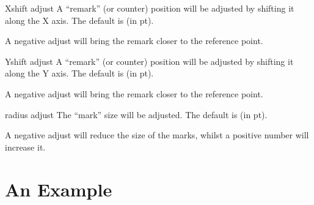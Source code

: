\documentclass{article}
\begin{document}
\begin{codedescribe}[key]{Xshift adjust}
A ``remark'' (or counter) position will be adjusted by shifting it along the X axis. The default is  (in pt).
\end{codedescribe}

\begin{tsremark}
A negative adjust will bring the remark closer to the reference point.
\end{tsremark}

\begin{codedescribe}[key]{Yshift adjust}
A ``remark'' (or counter) position will be adjusted by shifting it along the Y axis. The default is  (in pt).
\end{codedescribe}

\begin{tsremark}
A negative adjust will bring the remark closer to the reference point.
\end{tsremark}

\begin{codedescribe}[key]{radius adjust}
The ``mark'' size will be adjusted. The default is  (in pt).
\end{codedescribe}

\begin{tsremark}
A negative adjust will reduce the size of the marks, whilst a positive number will increase it.
\end{tsremark}

\newpage
\section{An Example}





\end{document}
